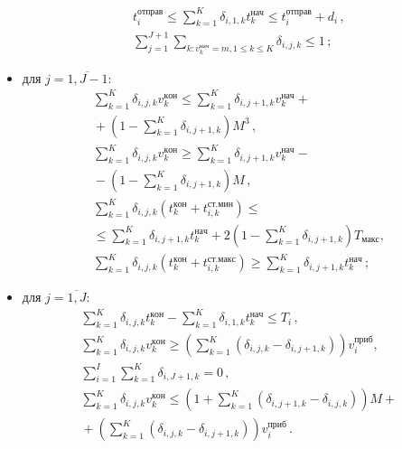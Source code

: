 \begin{multicols}{2}
\begin{itemize}
\noindent
\begin{multline}
t_i^{\mathrm{отправ}} \leq \sum\limits_{k=1}^K\delta_{i,1,k} 
t_k^{\mathrm{нач}}\leq t_i^{\mathrm{отправ}}+d_i\,,\\[1pt]
\displaystyle\sum\limits_{j=1}^{J+1}\sum\limits_{k: v_k^{\mathrm{нач}}=m, 1\leq k\leq K} 
\delta_{i,j,k}\leq 1\,;
  \label{e1-bos}
\end{multline}
 \item для $j=\overline{1,J-1}$: 
 \begin{multline}
 \sum\limits_{k=1}^K\delta_{i,j,k}v_k^{\mathrm{кон}}\leq 
\sum\limits^K_{k=1} \delta_{i,j+1,k} v_k^{\mathrm{нач}} +{}\\[1pt]
{}+\left( 1-
\sum\limits^K_{k=1} \delta_{i,j+1,k}\right)M^3\,,\\[1pt]
 \sum\limits^K_{k=1} \delta_{i,j,k} v_k^{\mathrm{кон}}\geq 
\sum\limits_{k=1}^K \delta_{i,j+1,k} v_k^{\mathrm{нач}}-{}\\[1pt]
{}-\left( 1- \sum^K_{k=1} 
\delta_{i,j+1,k}\right)M\,,\\[1pt]
  \sum\limits^K_{k=1} \delta_{i,j,k}\left( 
t_k^{\mathrm{кон}}+t_{i,k}^{\mathrm{ст.мин}}\right) \leq {}\\[1pt]
{}\leq 
\sum\limits^K_{k=1}\delta_{i,j+1,k} t_k^{\mathrm{нач}} +2\!\left(\!1- 
\sum\limits^K_{k=1} \delta_{i,j+1,k}\!\right) T_{\mathrm{макс}},\\[1pt]
  \sum\limits^K_{k=1} \delta_{i,j,k} \left( 
t_k^{\mathrm{кон}}+t_{i,k}^{\mathrm{ст.макс}}\right) \geq \sum\limits_{k=1}^K 
\delta_{i,j+1,k} t_k^{\mathrm{нач}}\,;
\end{multline}
\item для  $j=\overline{1,J}$:\\
\begin{multline}
 \sum\limits^K_{k=1} \delta_{i,j,k} t_k^{\mathrm{кон}} -
\sum\limits_{k=1}^K \delta_{i,1,k}t_k^{\mathrm{нач}} \leq T_i\,,\\[1pt]
 \sum\limits^K_{k=1} \delta_{i,j,k} v_k^{\mathrm{кон}} \geq 
\left(\sum\limits^K_{k=1}
   \left( \delta_{i,j,k}-\delta_{i,j+1,k}\right)\right) v_i^{\mathrm{приб}},\\[1pt]
\sum\limits^I_{i=1} \sum\limits^K_{k=1}
  \delta_{i,J+1,k}=0\,,\\[1pt]
  \sum\limits^K_{k=1}
   \delta_{i,j,k} v_k^{\mathrm{кон}} \!\leq \!\left( \! 1+ \!\sum\limits^K_{k=1}\!
   \left( \delta_{i,j+1,k}-\delta_{i,j,k}\right)\!\right)\! M+{}\\[1pt]
   {}+\left(\sum\limits^K_{k=1}\!
   \left( \delta_{i,j,k} -\delta_{i,j+1,k}\right)\right) v_i^{\mathrm{приб}}\,.
  \end{multline}
  \end{itemize}
  

\end{multicols}
